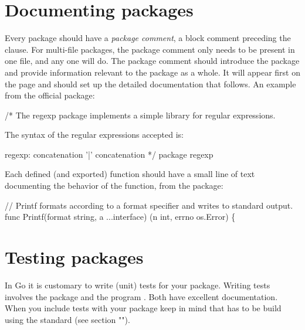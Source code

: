 
\section{Documenting packages}
Every package should have a \emph{package comment}, a block comment preceding the
 clause. For multi-file packages, the package comment only needs to be
present in one file, and any one will do. The package comment should introduce
the package and provide information relevant to the package as a whole. It will
appear first on the  page and should set up the detailed documentation
that follows. An example from the official  package:
\begin{display}
/*
    The regexp package implements a simple library for
    regular expressions.

    The syntax of the regular expressions accepted is:

    regexp:
        concatenation { '|' concatenation }
*/
package regexp
\end{display}

Each defined (and exported) function should have a small line of text
documenting the behavior of the function, from the 
package:
\begin{display}
// Printf formats according to a format specifier and writes to standard output.
func Printf(format string, a ...interface{}) (n int, errno os.Error) \{
\end{display}

\section{Testing packages}
In Go it is customary to write (unit) tests for your package. Writing
tests involves the  package and the program
. Both
have excellent documentation. When you include tests with your package
keep in mind that has to be build using the standard 
(see section "").


